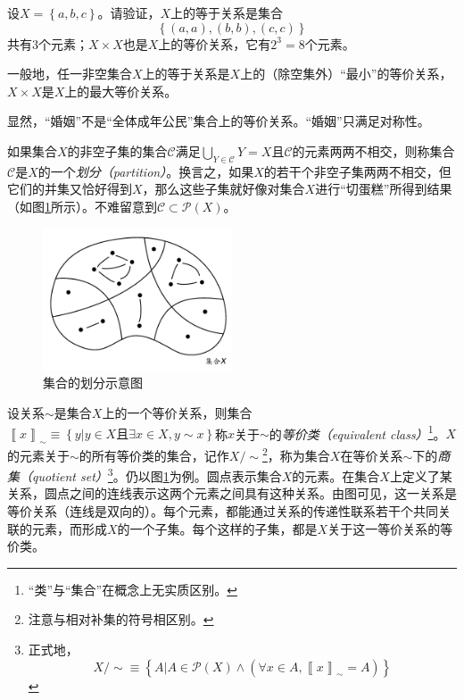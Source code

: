 \documentclass[../main.tex]{subfiles}
\begin{document}
\begin{example}
    设$X=\left\{a,b,c\right\}$。请验证，$X$上的等于关系是集合
    \[
        \left\{\left(a,a\right),\left(b,b\right),\left(c,c\right)\right\}
    \]
    共有3个元素；$X\times X$也是$X$上的等价关系，它有$2^3=8$个元素。

    一般地，任一非空集合$X$上的等于关系是$X$上的（除空集外）“最小”的等价关系，$X\times X$是$X$上的最大等价关系。

    显然，“婚姻”不是“全体成年公民”集合上的等价关系。“婚姻”只满足对称性。
\end{example}

如果集合$X$的非空子集的集合$\mathcal{C}$满足$\bigcup_{Y\in\mathcal{C}}Y=X$且$\mathcal{C}$的元素两两不相交，则称集合$\mathcal{C}$是$X$的一个\emph{划分（partition）}。换言之，如果$X$的若干个非空子集两两不相交，但它们的并集又恰好得到$X$，那么这些子集就好像对集合$X$进行“切蛋糕”所得到结果（如图\ref{fig:II.1.1}所示）。不难留意到$\mathcal{C}\subset\mathcal{P}\left(X\right)$。

\begin{figure}[htbp]
    \centering
    \includegraphics[width=0.5\textwidth]{../images/partition.pdf}
    \caption{集合的划分示意图}
    \label{fig:II.1.1}
\end{figure}

设关系$\sim$是集合$X$上的一个等价关系，则集合$\left\llbracket x\right\rrbracket_\sim\equiv\left\{y|y\in X\text{且}\exists x\in X,y\sim x\right\}$称$x$关于$\sim$的\emph{等价类（equivalent class）}\footnote{“类”与“集合”在概念上无实质区别。}。$X$的元素关于$\sim$的所有等价类的集合，记作$X/\sim$\footnote{注意与相对补集的符号相区别。}，称为集合$X$在等价关系$\sim$下的\emph{商集（quotient set）}\footnote{正式地，
    \[
        X/\sim\equiv\left\{A|A\in\mathcal{P}\left(X\right)\wedge\left(\forall x\in A,\left\llbracket x\right\rrbracket_\sim = A\right)\right\}
    \]
}。仍以图\ref{fig:II.1.1}为例。圆点表示集合$X$的元素。在集合$X$上定义了某关系，圆点之间的连线表示这两个元素之间具有这种关系。由图可见，这一关系是等价关系（连线是双向的）。每个元素，都能通过关系的传递性联系若干个共同关联的元素，而形成$X$的一个子集。每个这样的子集，都是$X$关于这一等价关系的等价类。
\end{document}
